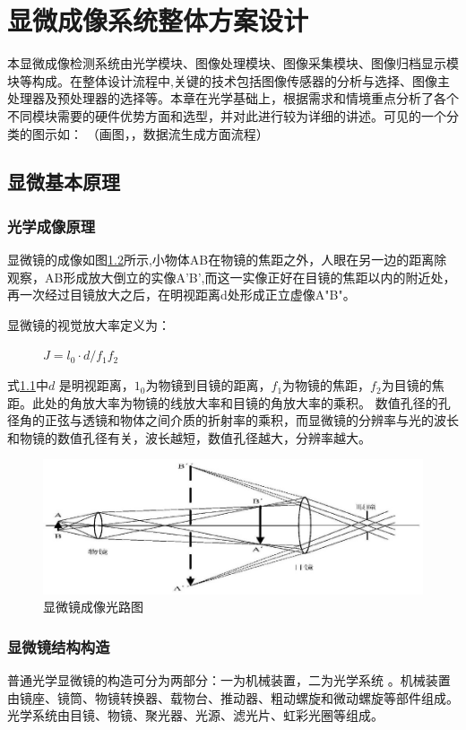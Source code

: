 \chapter{显微成像系统整体方案设计}
本显微成像检测系统由光学模块、图像处理模块、图像采集模块、图像归档显示模块等构成。在整体设计流程中,关键的技术包括图像传感器的分析与选择、图像主处理器及预处理器的选择等。本章在光学基础上，根据需求和情境重点分析了各个不同模块需要的硬件优势方面和选型，并对此进行较为详细的讲述。可见的一个分类的图示如：
（画图，，数据流生成方面流程）

\section{显微基本原理}
\subsection{光学成像原理}

显微镜的成像如图\ref{fig:micro_1}所示,小物体AB在物镜的焦距之外，人眼在另一边的距离除观察，AB形成放大倒立的实像A'B',而这一实像正好在目镜的焦距以内的附近处，再一次经过目镜放大之后，在明视距离d处形成正立虚像A"B"。

显微镜的视觉放大率定义为：

\begin{figure}
\centering
\label{j2}
	$J = l_{0}\cdot d / f_{1}f_{2}$
\end{figure}
式\ref{j2}中$d$ 是明视距离，$1_{0}$为物镜到目镜的距离，$f_{1}$为物镜的焦距，$f_{2}$为目镜的焦距。此处的角放大率为物镜的线放大率和目镜的角放大率的乘积。
数值孔径的孔径角的正弦与透镜和物体之间介质的折射率的乘积，而显微镜的分辨率与光的波长和物镜的数值孔径有关，波长越短，数值孔径越大，分辨率越大。
\begin{figure}
	\centering
	\includegraphics[width=0.7\linewidth]{Figure/micro_1}
	\caption[显微镜成像光路图]{显微镜成像光路图}
	\label{fig:micro_1}
\end{figure}

\subsection{显微镜结构构造}
普通光学显微镜的构造可分为两部分：一为机械装置，二为光学系统 。机械装置由镜座、镜筒、物镜转换器、载物台、推动器、粗动螺旋和微动螺旋等部件组成。光学系统由目镜、物镜、聚光器、光源、滤光片、虹彩光圈等组成。

